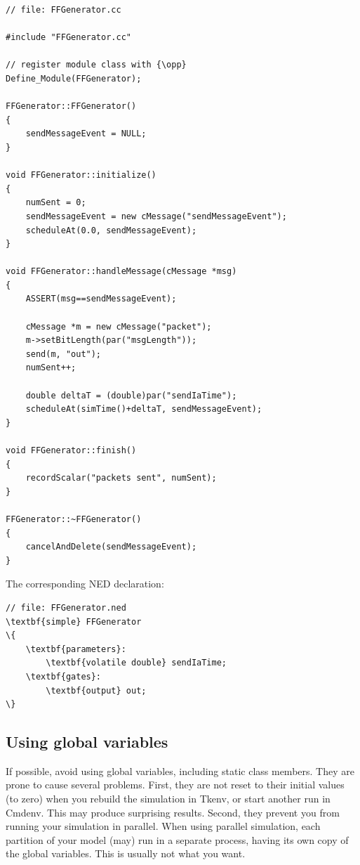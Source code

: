\begin{verbatim}
// file: FFGenerator.cc

#include "FFGenerator.cc"

// register module class with {\opp}
Define_Module(FFGenerator);

FFGenerator::FFGenerator()
{
    sendMessageEvent = NULL;
}

void FFGenerator::initialize()
{
    numSent = 0;
    sendMessageEvent = new cMessage("sendMessageEvent");
    scheduleAt(0.0, sendMessageEvent);
}

void FFGenerator::handleMessage(cMessage *msg)
{
    ASSERT(msg==sendMessageEvent);

    cMessage *m = new cMessage("packet");
    m->setBitLength(par("msgLength"));
    send(m, "out");
    numSent++;

    double deltaT = (double)par("sendIaTime");
    scheduleAt(simTime()+deltaT, sendMessageEvent);
}

void FFGenerator::finish()
{
    recordScalar("packets sent", numSent);
}

FFGenerator::~FFGenerator()
{
    cancelAndDelete(sendMessageEvent);
}
\end{verbatim}

The corresponding NED declaration:

\begin{Verbatim}[commandchars=\\\{\}]
// file: FFGenerator.ned
\textbf{simple} FFGenerator
\{
    \textbf{parameters}:
        \textbf{volatile double} sendIaTime;
    \textbf{gates}:
        \textbf{output} out;
\}
\end{Verbatim}




\subsection{Using global variables}
\label{sec:simple-modules:global-vars}

If possible, avoid using global variables, including
static class members. They are prone to cause several problems.
First, they are not reset to their initial values (to zero)
when you rebuild the simulation in Tkenv, or start another run
in Cmdenv. This may produce surprising results.
Second, they prevent you from running your simulation in parallel.
When using parallel simulation, each partition of your model
(may) run in a separate process, having its own copy of the
global variables. This is usually not what you want.

